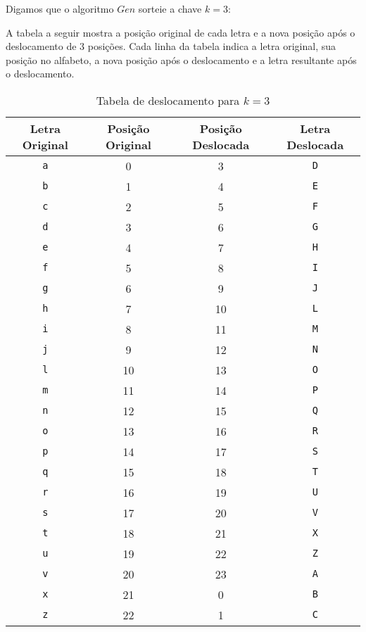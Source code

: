 \begin{example}
  Digamos que o algoritmo $Gen$ sorteie a chave $k = 3$:

  A tabela a seguir mostra a posição original de cada letra e a nova posição após o deslocamento de 3 posições.
  Cada linha da tabela indica a letra original, sua posição no alfabeto, a nova posição após o deslocamento e a letra resultante após o deslocamento.

  
  \begin{table}[h!]
    \centering
    \begin{tabular}{|c|c|c|c|}
      \hline
      \textbf{Letra Original} & \textbf{Posição Original} & \textbf{Posição Deslocada} & \textbf{Letra Deslocada} \\
      \hline
      \texttt{a} & 0 & 3 & \texttt{D} \\
      \hline
      \texttt{b} & 1 & 4 & \texttt{E} \\
      \hline
      \texttt{c} & 2 & 5 & \texttt{F} \\
      \hline
      \texttt{d} & 3 & 6 & \texttt{G} \\
      \hline
      \texttt{e} & 4 & 7 & \texttt{H} \\
      \hline
      \texttt{f} & 5 & 8 & \texttt{I} \\
      \hline
      \texttt{g} & 6 & 9 & \texttt{J} \\
      \hline
      \texttt{h} & 7 & 10 & \texttt{L} \\
      \hline
      \texttt{i} & 8 & 11 & \texttt{M} \\
      \hline
      \texttt{j} & 9 & 12 & \texttt{N} \\
      \hline
      \texttt{l} & 10 & 13 & \texttt{O} \\
      \hline
      \texttt{m} & 11 & 14 & \texttt{P} \\
      \hline
      \texttt{n} & 12 & 15 & \texttt{Q} \\
      \hline
      \texttt{o} & 13 & 16 & \texttt{R} \\
      \hline
      \texttt{p} & 14 & 17 & \texttt{S} \\
      \hline
      \texttt{q} & 15 & 18 & \texttt{T} \\
      \hline
      \texttt{r} & 16 & 19 & \texttt{U} \\
      \hline
      \texttt{s} & 17 & 20 & \texttt{V} \\
      \hline
      \texttt{t} & 18 & 21 & \texttt{X} \\
      \hline
      \texttt{u} & 19 & 22 & \texttt{Z} \\
      \hline
      \texttt{v} & 20 & 23 & \texttt{A} \\
      \hline
      \texttt{x} & 21 & 0 & \texttt{B} \\
      \hline
      \texttt{z} & 22 & 1 & \texttt{C} \\
      \hline
    \end{tabular}
    \caption{Tabela de deslocamento para $k=3$}
    \label{table:cesar_shift}
  \end{table}


\end{example}
